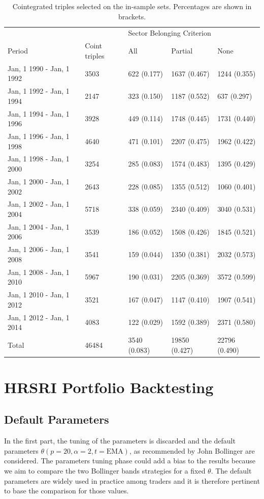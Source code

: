 \documentclass[11pt,a4,twosided,singlespacing,titlepagenumber=on]{scrreprt}
\numberwithin{equation}{chapter} %
\theoremstyle{remark}
\begin{document}
\begin{table}[H]
\centering
\begin{tabular}{lllll}
\hline
                              && \multicolumn{3}{l}{Sector Belonging Criterion}  \\
Period & Coint triples & All & Partial & None \\
\hline
Jan, 1 1990 - Jan, 1 1992 & 3503    & 622 (0.177) & 1637 (0.467) & 1244 (0.355) \\
Jan, 1 1992 - Jan, 1 1994 & 2147    & 323 (0.150) & 1187 (0.552)  & 637 (0.297) \\
Jan, 1 1994 - Jan, 1 1996 & 3928    & 449 (0.114) & 1748 (0.445)  & 1731 (0.440) \\
Jan, 1 1996 - Jan, 1 1998 & 4640    & 471 (0.101) & 2207 (0.475)  & 1962 (0.422) \\
Jan, 1 1998 - Jan, 1 2000 & 3254    & 285 (0.083) & 1574 (0.483)  & 1395 (0.429) \\
Jan, 1 2000 - Jan, 1 2002 & 2643    & 228 (0.085) & 1355 (0.512)  & 1060 (0.401)\\
Jan, 1 2002 - Jan, 1 2004 & 5718    & 338 (0.059) & 2340 (0.409)  & 3040 (0.531) \\
Jan, 1 2004 - Jan, 1 2006 & 3539    & 186 (0.052) & 1508 (0.426)  & 1845 (0.521) \\
Jan, 1 2006 - Jan, 1 2008 & 3541    & 159 (0.044) & 1350 (0.381)  & 2032 (0.573) \\
Jan, 1 2008 - Jan, 1 2010 & 5967    & 190 (0.031) & 2205 (0.369)  & 3572 (0.599) \\
Jan, 1 2010 - Jan, 1 2012 & 3521    & 167 (0.047) & 1147 (0.410)  & 1907 (0.541) \\
Jan, 1 2012 - Jan, 1 2014 & 4083    & 122 (0.029) & 1592 (0.389)  & 2371 (0.580) \\
\hline
Total & 46484 & 3540 (0.083) & 19850 (0.427) & 22796 (0.490) \\
\hline
\end{tabular}
\caption{Cointegrated triples selected on the in-sample sets. Percentages are shown in brackets.}
\label{tab:calibration_selection}
\end{table}

\section{HRSRI Portfolio Backtesting}

\subsection{Default Parameters}
In the first part, the tuning of the parameters is discarded and the default parameters $\theta (p=20, \alpha = 2, t = \text{EMA})$, as recommended by John Bollinger are considered. The parameters tuning phase could add a bias to the results because we aim to compare the two Bollinger bands strategies for a fixed $\theta$. The default parameters are widely used in practice among traders and it is therefore pertinent to base the comparison for those values. \\
\end{document}
